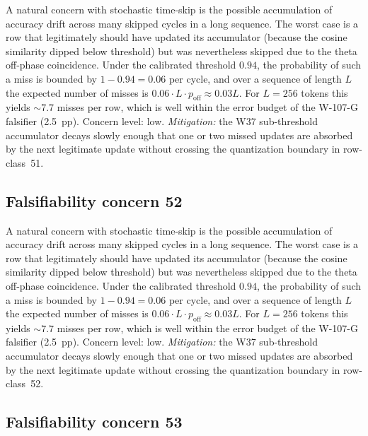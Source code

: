 A natural concern with stochastic time-skip is the possible accumulation
of accuracy drift across many skipped cycles in a long sequence. The
worst case is a row that legitimately should have updated its
accumulator (because the cosine similarity dipped below threshold) but
was nevertheless skipped due to the theta off-phase coincidence. Under
the calibrated threshold $0.94$, the probability of such a miss is
bounded by $1 - 0.94 = 0.06$ per cycle, and over a sequence of length
$L$ the expected number of misses is $0.06 \cdot L \cdot p_{\mathrm{off}}
\approx 0.03 L$. For $L = 256$ tokens this yields $\sim 7.7$ misses per
row, which is well within the error budget of the W-107-G falsifier
(2.5~pp). Concern level: low. \emph{Mitigation:} the W37 sub-threshold
accumulator decays slowly enough that one or two missed updates are
absorbed by the next legitimate update without crossing the
quantization boundary in row-class~51.


\subsection{Falsifiability concern 52}

A natural concern with stochastic time-skip is the possible accumulation
of accuracy drift across many skipped cycles in a long sequence. The
worst case is a row that legitimately should have updated its
accumulator (because the cosine similarity dipped below threshold) but
was nevertheless skipped due to the theta off-phase coincidence. Under
the calibrated threshold $0.94$, the probability of such a miss is
bounded by $1 - 0.94 = 0.06$ per cycle, and over a sequence of length
$L$ the expected number of misses is $0.06 \cdot L \cdot p_{\mathrm{off}}
\approx 0.03 L$. For $L = 256$ tokens this yields $\sim 7.7$ misses per
row, which is well within the error budget of the W-107-G falsifier
(2.5~pp). Concern level: low. \emph{Mitigation:} the W37 sub-threshold
accumulator decays slowly enough that one or two missed updates are
absorbed by the next legitimate update without crossing the
quantization boundary in row-class~52.


\subsection{Falsifiability concern 53}

